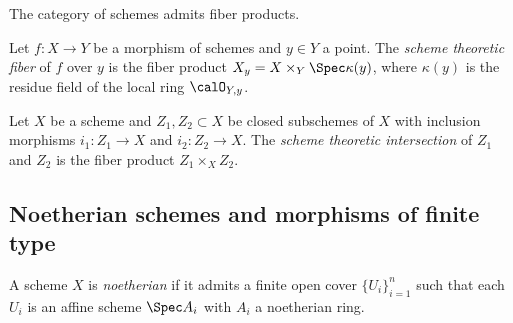     \begin{theorem}\label{thm:fiber_product_of_schemes_exists}
        The category of schemes admits fiber products.
    \end{theorem}

    \begin{definition}\label{def:scheme_theoretic_fiber}
        Let \(f : X \to Y\) be a morphism of schemes and \(y \in Y\) a point.
        The \emph{scheme theoretic fiber} of \(f\) over \(y\) is the fiber product \(X_y = X \times_Y \Spec \kappa(y)\), where \(\kappa(y)\) is the residue field of the local ring \(\calO_{Y,y}\).
        
    \end{definition}

    \begin{definition}\label{def:scheme_theoretic_intersection}
        Let \(X\) be a scheme and \(Z_1, Z_2 \subset X\) be closed subschemes of \(X\) with inclusion morphisms \(i_1 : Z_1 \to X\) and \(i_2 : Z_2 \to X\).
        The \emph{scheme theoretic intersection} of \(Z_1\) and \(Z_2\) is the fiber product \(Z_1 \times_X Z_2\).
    \end{definition}


\subsection{Noetherian schemes and morphisms of finite type}

    \begin{definition}\label{def:noetherian_scheme}
        A scheme \(X\) is \emph{noetherian} if it admits a finite open cover \(\{U_i\}_{i=1}^n\) such that each \(U_i\) is an affine scheme \(\Spec A_i\) with \(A_i\) a noetherian ring.
    \end{definition}

